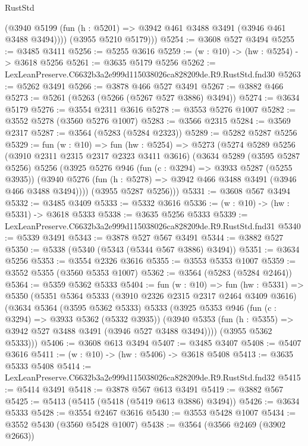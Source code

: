 \begin{lexlean}{RustStd}
\begin{coremodule}
          (@3940 @5199 (fun (h : @5201) => @3942 @461 @3488 @3491 (@3946 @461 @3488 @3494))))
        (@3955 @5210 @5179)))
@5254 := @3608 @527 @3494
@5255 := @3485 @3411
@5256 := @5255 @3616
@5259 := (w : @10) -> (hw : @5254) -> @3618 @5256
@5261 := @3635 @5179 @5256
@5262 := LexLeanPreserve.C6632b3a2e999d115038026ca828209de.R9.RustStd.fnd30
@5263 := @5262 @3491
@5266 := @3878 @466 @527 @3491
@5267 := @3882 @466
@5273 := @5261 (@5263 (@5266 (@5267 @527 @3886) @3494))
@5274 := @3634 @5179
@5276 := @3554 @2311 @3616
@5278 := @3553 @5276 @1007
@5282 := @3552 @5278 (@3560 @5276 @1007)
@5283 := @3566 @2315
@5284 := @3569 @2317
@5287 := @3564 (@5283 (@5284 @2323))
@5289 := @5282 @5287 @5256
@5329 := fun (w : @10) =>
  fun (hw : @5254) =>
  @5273
    (@5274
      @5289
      @5256
      (@3910 @2311 @2315 @2317 @2323 @3411 @3616)
      (@3634
        @5289
        (@3595 @5287 @5256)
        @5256
        (@3925
          @5276
          @946
          (fun (c : @3294) => @3933 @5287 (@5255 @3935))
          (@3940 @5276 (fun (h : @5278) => @3942 @466 @3488 @3491 (@3946 @466 @3488 @3494))))
        (@3955 @5287 @5256)))
@5331 := @3608 @567 @3494
@5332 := @3485 @3409
@5333 := @5332 @3616
@5336 := (w : @10) -> (hw : @5331) -> @3618 @5333
@5338 := @3635 @5256 @5333
@5339 := LexLeanPreserve.C6632b3a2e999d115038026ca828209de.R9.RustStd.fnd31
@5340 := @5339 @3491
@5343 := @3878 @527 @567 @3491
@5344 := @3882 @527
@5350 := @5338 (@5340 (@5343 (@5344 @567 @3886) @3494))
@5351 := @3634 @5256
@5353 := @3554 @2326 @3616
@5355 := @3553 @5353 @1007
@5359 := @3552 @5355 (@3560 @5353 @1007)
@5362 := @3564 (@5283 (@5284 @2464))
@5364 := @5359 @5362 @5333
@5404 := fun (w : @10) =>
  fun (hw : @5331) =>
  @5350
    (@5351
      @5364
      @5333
      (@3910 @2326 @2315 @2317 @2464 @3409 @3616)
      (@3634
        @5364
        (@3595 @5362 @5333)
        @5333
        (@3925
          @5353
          @946
          (fun (c : @3294) => @3933 @5362 (@5332 @3935))
          (@3940 @5353 (fun (h : @5355) => @3942 @527 @3488 @3491 (@3946 @527 @3488 @3494))))
        (@3955 @5362 @5333)))
@5406 := @3608 @613 @3494
@5407 := @3485 @3407
@5408 := @5407 @3616
@5411 := (w : @10) -> (hw : @5406) -> @3618 @5408
@5413 := @3635 @5333 @5408
@5414 := LexLeanPreserve.C6632b3a2e999d115038026ca828209de.R9.RustStd.fnd32
@5415 := @5414 @3491
@5418 := @3878 @567 @613 @3491
@5419 := @3882 @567
@5425 := @5413 (@5415 (@5418 (@5419 @613 @3886) @3494))
@5426 := @3634 @5333
@5428 := @3554 @2467 @3616
@5430 := @3553 @5428 @1007
@5434 := @3552 @5430 (@3560 @5428 @1007)
@5438 := @3564 (@3566 @2469 (@3902 @2663))

\end{coremodule}
\end{lexlean}
